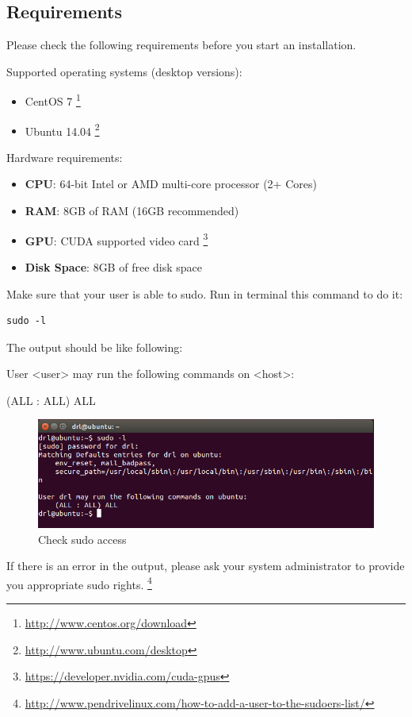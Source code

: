 \documentclass[a4paper,oneside,dvipsnames]{article}
\begin{document}
\subsection[Requirements]{Requirements}
\begin{tcolorbox}[colbacktitle=red!40!white, coltitle=black, width=\linewidth, fonttitle=\bfseries, title=Note]
Please check the following requirements before you start an installation.
\end{tcolorbox}
\noindent
Supported operating systems (desktop versions):
\begin{itemize}
\item CentOS 7
  \footnote{\url{http://www.centos.org/download}}
\item Ubuntu 14.04
  \footnote{\url{http://www.ubuntu.com/desktop}}
\end{itemize}
Hardware requirements:
\begin{itemize}
\item \textbf{CPU}: 64-bit Intel or AMD multi-core processor (2+ Cores)
\item \textbf{RAM}: 8GB of RAM (16GB recommended)
\item \textbf{GPU}: CUDA supported video card 
  \footnote{\url{https://developer.nvidia.com/cuda-gpus}}
\item \textbf{Disk Space}: 8GB of free disk space
\end{itemize}
Make sure that your user is able to sudo. Run in terminal this command to do it:
\begin{verbatim}
sudo -l
\end{verbatim}
\noindent
The output should be like following:
\begin{tcolorbox}[colbacktitle=gray!40!white, coltitle=black, width=\linewidth, fonttitle=\bfseries, title=Output]
User <user> may run the following commands on <host>:

(ALL : ALL) ALL
\end{tcolorbox}
\begin{figure}[H]
  \centering
  \includegraphics[width=1\textwidth]{sudo_access.png}
  \caption*{Check sudo access}
  \label{fig:sudoAccess}
\end{figure}
\noindent
If there is an error in the output, please ask your system administrator to provide you appropriate sudo rights. \footnote{\url{http://www.pendrivelinux.com/how-to-add-a-user-to-the-sudoers-list/}}
\end{document}
